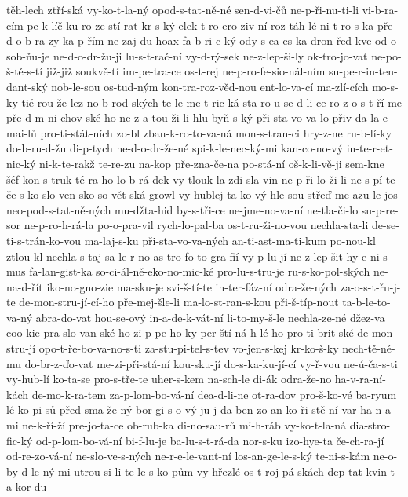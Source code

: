 {těh-lech
ztří-ská
vy-ko-t-la-ný
opod-s-tat-ně-né
sen-d-vi-čů
ne-p-ři-nu-ti-li
vi-b-ra-cím
pe-k-líč-ku
ro-ze-stí-rat
kr-s-ký
elek-t-ro-ero-ziv-ní
roz-táh-lé
ni-t-ro-s-ka
pře-d-o-b-ra-zy
ka-p-řím
ne-zaj-du
hoax
fa-b-ri-c-ký
ody-s-ea
es-ka-dron
řed-kve
od-o-sob-ňu-je
ne-d-o-dr-žu-ji
lu-s-t-rač-ní
vy-d-rý-sek
ne-z-lep-ši-ly
ok-tro-jo-vat
ne-po-š-tě-s-tí
již-již
soukvě-tí
im-pe-tra-ce
os-t-rej
ne-p-ro-fe-sio-nál-ním
su-pe-r-in-ten-dant-ský
nob-le-sou
os-tud-ným
kon-tra-roz-věd-nou
ent-lo-va-cí
ma-zlí-cích
mo-s-ky-tié-rou
že-lez-no-b-rod-ských
te-le-me-t-ric-ká
sta-ro-u-se-d-li-ce
ro-z-o-s-t-ří-me
pře-d-m-ni-chov-ské-ho
ne-z-a-tou-ži-li
hlu-byň-s-ký
při-sta-vo-va-lo
přiv-da-la
e-mai-lů
pro-ti-stát-ních
zo-bl
zban-k-ro-to-va-ná
mon-s-tran-ci
hry-z-ne
ru-b-lí-ky
do-b-ru-d-žu
di-p-tych
ne-d-o-dr-že-né
spi-k-le-nec-ký-mi
kan-co-no-vý
in-te-r-et-nic-ký
ni-k-te-rakž
te-re-zu
na-kop
pře-zna-če-na
po-stá-ní
oš-k-li-vě-ji
sem-kne
šéf-kon-s-truk-té-ra
ho-lo-b-rá-dek
vy-tlouk-la
zdi-sla-vin
ne-p-ři-lo-ži-li
ne-s-pí-te
če-s-ko-slo-ven-sko-so-vět-ská
growl
vy-hublej
ta-ko-vý-hle
sou-střeď-me
azu-le-jos
neo-pod-s-tat-ně-ných
mu-džta-hid
by-s-tři-ce
ne-jme-no-va-ní
ne-tla-či-lo
su-p-re-sor
ne-p-ro-h-rá-la
po-o-pra-vil
rych-lo-pal-ba
os-t-ru-ži-no-vou
nechla-sta-li
de-se-ti-s-trán-ko-vou
ma-laj-s-ku
při-sta-vo-va-ných
an-ti-ast-ma-ti-kum
po-nou-kl
ztlou-kl
nechla-s-taj
sa-le-r-no
as-tro-fo-to-gra-fií
vy-p-lu-jí
ne-z-lep-šit
hy-e-ni-s-mus
fa-lan-gist-ka
so-ci-ál-ně-eko-no-mic-ké
pro-lu-s-tru-je
ru-s-ko-pol-ských
ne-na-d-řít
iko-no-gno-zie
ma-sku-je
svi-š-tí-te
in-ter-fáz-ní
odra-že-ných
za-o-s-t-řu-j-te
de-mon-stru-jí-cí-ho
pře-mej-šle-li
ma-lo-st-ran-s-kou
při-š-típ-nout
ta-b-le-to-va-ný
abra-do-vat
hou-se-ový
in-a-de-k-vát-ní
li-to-my-š-le
nechla-ze-né
džez-va
coo-kie
pra-slo-van-ské-ho
zi-p-pe-ho
ky-per-ští
ná-h-lé-ho
pro-ti-brit-ské
de-mon-stru-jí
opo-t-ře-bo-va-no-s-ti
za-stu-pi-tel-s-tev
vo-jen-s-kej
kr-ko-š-ky
nech-tě-né-mu
do-br-z-ďo-vat
me-zi-při-stá-ní
kou-sku-jí
do-s-ka-ku-jí-cí
vy-ř-vou
ne-ú-ča-s-ti
vy-hub-lí
ko-ta-se
pro-s-tře-te
uher-s-kem
na-sch-le
di-ák
odra-že-no
ha-v-ra-ní-kách
de-mo-k-ra-tem
za-p-lom-bo-vá-ní
dea-d-li-ne
ot-ra-dov
pro-š-ko-vé
ba-ryum
lé-ko-pi-sů
před-sma-že-ný
bor-gi-s-o-vý
ju-j-da
ben-zo-an
ko-ři-stě-ní
var-ha-n-a-mi
ne-k-ří-ží
pre-jo-ta-ce
ob-rub-ka
di-no-sau-rů
mi-h-ráb
vy-ko-t-la-ná
dia-stro-fic-ký
od-p-lom-bo-vá-ní
bi-f-lu-je
ba-lu-s-t-rá-da
nor-s-ku
izo-hye-ta
če-ch-ra-jí
od-re-zo-vá-ní
ne-slo-ve-s-ných
ne-r-e-le-vant-ní
los-an-ge-le-s-ký
te-ni-s-kám
ne-o-by-d-le-ný-mi
utrou-si-li
te-le-s-ko-pům
vy-hřezlé
os-t-roj
pá-skách
dep-tat
kvin-t-a-kor-du
}
